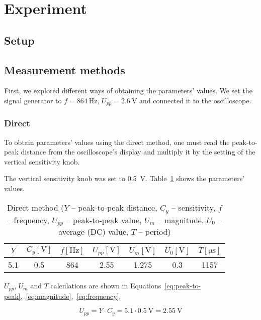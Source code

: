 \section{Experiment}
\subsection{Setup}

\subsection{Measurement methods}

First, we explored different ways of obtaining the parameters' values. We set the signal generator to $f = \SI{864}{\hertz}$, $U_{pp} = \SI{2.6}{\volt}$ and connected it to the oscilloscope.

\subsubsection*{Direct}

 To obtain parameters' values using the direct method, one must read the peak-to-peak distance from the oscilloscope's display and multiply it by the setting of the vertical sensitivity knob.

The vertical sensitivity knob was set to \SI{0.5}{\volt}. Table~\ref{tab:direct-method} shows the parameters' values.

\begin{table}[H]
	\centering
	\begin{tabular}{c|c|c|c|c|c|c}
		$Y$ & $C_{y} [\unit{\volt}]$ & $f [\unit{\hertz}]$ & $U_{pp} [\unit{\volt}]$ & $U_{m} [\unit{\volt}]$ & $U_{0} [\unit{\volt}]$ & $T [\unit{\micro\second}]$\\
		\hline
		5.1 & 0.5 & 864 & 2.55 & 1.275 & 0.3 & 1157
	\end{tabular}
	\caption{Direct method ($Y$ -- peak-to-peak distance, $C_{y}$ -- sensitivity, $f$ -- frequency, $U_{pp}$ -- peak-to-peak value, $U_{m}$ -- magnitude, $U_{0}$ -- average (DC) value, $T$ -- period)}
	\label{tab:direct-method}
\end{table}

$U_{pp}$, $U_{m}$ and $T$ calculations are shown in Equations~\ref{eq:peak-to-peak},~\ref{eq:magnitude},~\ref{eq:frequency}.


\begin{equation}
	U_{pp} = Y\cdot C_{y} = 5.1\cdot \SI{0.5}{\volt} = \SI{2.55}{\volt}
	\label{eq:peak-to-peak}
\end{equation}

